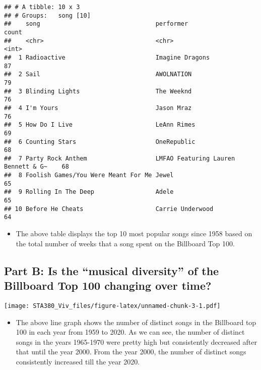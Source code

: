 \documentclass[
  12pt,
]{article}
\providecommand{\tightlist}{%
  \setlength{\itemsep}{0pt}\setlength{\parskip}{0pt}}
\begin{document}
\begin{verbatim}
## # A tibble: 10 x 3
## # Groups:   song [10]
##    song                                performer                           count
##    <chr>                               <chr>                               <int>
##  1 Radioactive                         Imagine Dragons                        87
##  2 Sail                                AWOLNATION                             79
##  3 Blinding Lights                     The Weeknd                             76
##  4 I'm Yours                           Jason Mraz                             76
##  5 How Do I Live                       LeAnn Rimes                            69
##  6 Counting Stars                      OneRepublic                            68
##  7 Party Rock Anthem                   LMFAO Featuring Lauren Bennett & G~    68
##  8 Foolish Games/You Were Meant For Me Jewel                                  65
##  9 Rolling In The Deep                 Adele                                  65
## 10 Before He Cheats                    Carrie Underwood                       64
\end{verbatim}

\begin{itemize}
\tightlist
\item
  The above table displays the top 10 most popular songs since 1958
  based on the total number of weeks that a song spent on the Billboard
  Top 100.
\end{itemize}

\hypertarget{part-b-is-the-musical-diversity-of-the-billboard-top-100-changing-over-time}{%
\subsection{Part B: Is the ``musical diversity'' of the Billboard Top
100 changing over
time?}\label{part-b-is-the-musical-diversity-of-the-billboard-top-100-changing-over-time}}

\texttt{[image: STA380\_Viv\_files/figure-latex/unnamed-chunk-3-1.pdf]}

\begin{itemize}
\tightlist
\item
  The above line graph shows the number of distinct songs in the
  Billboard top 100 in each year from 1959 to 2020. As we can see, the
  number of distinct songs in the years 1965-1970 were pretty high but
  consistently decreased after that until the year 2000. From the year
  2000, the number of distinct songs consistently increased till the
  year 2020.
\end{itemize}
\end{document}
